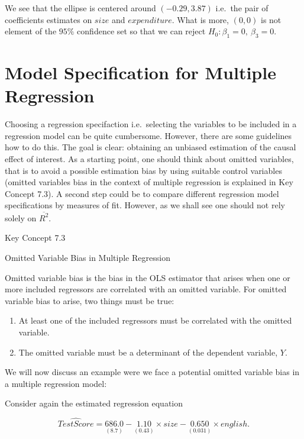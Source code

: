 \documentclass[]{book}
\providecommand{\tightlist}{%
  \setlength{\itemsep}{0pt}\setlength{\parskip}{0pt}}
\theoremstyle{definition}
\theoremstyle{definition}
\theoremstyle{definition}
\theoremstyle{remark}
\begin{document}
We see that the ellipse is centered around \((-0.29, 3.87)\) i.e.~the
pair of coefficients estimates on \(size\) and \(expenditure\). What is
more, \((0,0)\) is not element of the \(95\%\) confidence set so that we
can reject \(H_0: \beta_1 = 0, \ \beta_3 = 0\).

\section{Model Specification for Multiple
Regression}\label{model-specification-for-multiple-regression}

Choosing a regression specifaction i.e.~selecting the variables to be
included in a regression model can be quite cumbersome. However, there
are some guidelines how to do this. The goal is clear: obtaining an
unbiased estimation of the causal effect of interest. As a starting
point, one should think about omitted variables, that is to avoid a
possible estimation bias by using suitable control variables (omitted
variables bias in the context of multiple regression is explained in Key
Concept 7.3). A second step could be to compare different regression
model specifications by measures of fit. However, as we shall see one
should not rely solely on \(\overline{R^2}\).

Key Concept 7.3

Omitted Variable Bias in Multiple Regression

Omitted variable bias is the bias in the OLS estimator that arises when
one or more included regressors are correlated with an omitted variable.
For omitted variable bias to arise, two things must be true:

\begin{enumerate}
\def\labelenumi{\arabic{enumi}.}
\tightlist
\item
  At least one of the included regressors must be correlated with the
  omitted variable.
\item
  The omitted variable must be a determinant of the dependent variable,
  \(Y\).
\end{enumerate}

We will now discuss an example were we face a potential omitted variable
bias in a multiple regression model:

Consider again the estimated regression equation

\[ \widehat{TestScore} = \underset{(8.7)}{686.0} - \underset{(0.43)}{1.10} \times size - \underset{(0.031)}{0.650} \times english. \]
\end{document}
